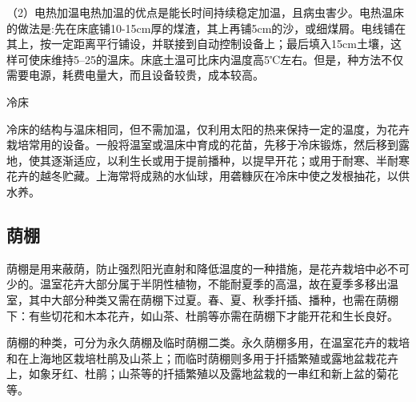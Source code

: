 \documentclass{ctexbook}
\begin{document}
（2）电热加温电热加温的优点是能长时间持续稳定加温，且病虫害少。电热温床的做法是:先在床底铺10-15cm厚的煤渣，其上再铺5cm的沙，或细煤屑。电线铺在其上，按一定距离平行铺设，并联接到自动控制设备上；最后填入15cm土壤，这样可使床维持5--25的温床。床底土温可比床内温度高5℃左右。但是，种方法不仅需要电源，耗费电量大，而且设备较贵，成本较高。

冷床

冷床的结构与温床相同，但不需加温，仅利用太阳的热来保持一定的温度，为花卉栽培常用的设备。一般将温室或温床中育成的花苗，先移于冷床锻炼，然后移到露地，使其逐渐适应，以利生长或用于提前播种，以提早开花；或用于耐寒、半耐寒花卉的越冬贮藏。上海常将成熟的水仙球，用砻糠灰在冷床中使之发根抽花，以供水养。
\subsection{荫棚}
荫棚是用来蔽荫，防止强烈阳光直射和降低温度的一种措施，是花卉栽培中必不可少的。温室花卉大部分属于半阴性植物，不能耐夏季的高温，故在夏季多移出温室，其中大部分种类又需在荫棚下过夏。春、夏、秋季扦插、播种，也需在荫棚下：有些切花和木本花卉，如山茶、杜鹃等亦需在荫棚下才能开花和生长良好。

荫棚的种类，可分为永久荫棚及临时荫棚二类。永久荫棚多用，在温室花卉的栽培和在上海地区栽培杜鹃及山茶上；而临时荫棚则多用于扦插繁殖或露地盆栽花卉上，如象牙红、杜鹃；山茶等的扦插繁殖以及露地盆栽的一串红和新上盆的菊花等。
\end{document}
